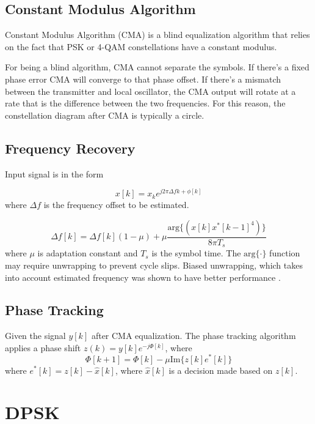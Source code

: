 \documentclass[a4paper]{article}
\begin{document}
\subsection{Constant Modulus Algorithm}

Constant Modulus Algorithm (CMA) is a blind equalization algorithm that relies on the fact that PSK or 4-QAM constellations have a constant modulus. 

For being a blind algorithm, CMA cannot separate the symbols. If there's a fixed phase error CMA will converge to that phase offset. If there's a mismatch between the transmitter and local oscillator, the CMA output will rotate at a rate that is the difference between the two frequencies. For this reason, the constellation diagram after CMA is typically a circle. 


\subsection{Frequency Recovery}
\cite{Hoffmann2008} 

Input signal is in the form

\begin{equation}
x[k] = x_ke^{j2\pi\Delta fk + \phi[k]}
\end{equation}
where $\Delta f$ is the frequency offset to be estimated.

\begin{equation}
\Delta f[k] = \Delta f[k](1-\mu) + \mu\frac{\mathrm{arg}\{(x[k]x^*[k-1]^4)\}}{8\pi T_s}
\end{equation}
where $\mu$ is adaptation constant and $T_s$ is the symbol time. The $\mathrm{arg}\{\cdot\}$ function may require unwrapping to prevent cycle slips. Biased unwrapping, which takes into account estimated frequency was shown to have better performance \cite{Hoffmann2008}.

\subsection{Phase Tracking}
\cite{Phase1995}

Given the signal $y[k]$ after CMA equalization. The phase tracking algorithm applies a phase shift $z(k) = y[k]e^{-j\Phi[k]}$, where
\begin{equation}
\Phi[k+1] = \Phi[k]-\mu\mathrm{Im}\{z[k]e^*[k]\}
\end{equation}
where $e^*[k] = z[k] - \hat{x}[k]$, where $\hat{x}[k]$ is a decision made based on $z[k]$.


\section{DPSK}
\end{document}
